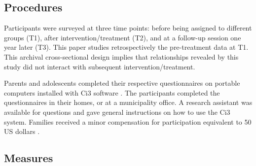 \subsection{Procedures}

Participants were surveyed at three time points: before being assigned to different groups (T1), after intervention/treatment (T2), and at a follow-up session one year later (T3). This paper studies retrospectively the pre-treatment data at T1. This archival cross-sectional design implies that relationships revealed by this study did not interact with subsequent intervention/treatment.

Parents and adolescents completed their respective questionnaires on portable computers installed with \textsf{Ci3} software \parencite{sawtooth:2013}. The participants completed the questionnaires in their homes, or at a municipality office. A research assistant was available for questions and gave general instructions on how to use the \textsf{Ci3} system. Families received a minor compensation for participation equivalent to 50 US dollars \parencite{thogersen:2020}.

\subsection{Measures}



